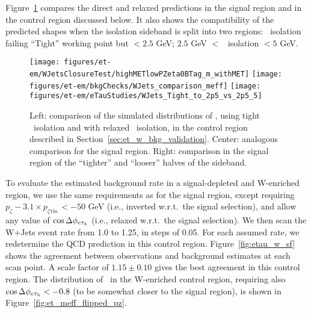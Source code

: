 Figure~\ref{fig:et-w-shape} compares the direct and relaxed
predictions in the signal region and in the control region discussed
below.  It also shows the compatibility of the predicted shapes when
the isolation sideband is split into two regions: \tauh ~isolation
failing ``Tight'' working point but $<2.5$ GeV; $2.5$ GeV $<$ \tauh ~isolation $< 5$ GeV.

\begin{figure}[thbp!]\centering
  \texttt{[image: figures/et-em/WJetsClosureTest/highMETlowPZeta0BTag\_m\_withMET]}
  \texttt{[image: figures/et-em/bkgChecks/WJets\_comparison\_meff]}
  \texttt{[image: figures/et-em/eTauStudies/WJets\_Tight\_to\_2p5\_vs\_2p5\_5]}
  \caption{\label{fig:et-w-shape} Left: comparison of the simulated
    distributions of \meffetau , using tight \tauh ~isolation and with
    relaxed \tauh ~isolation, in the control region described in
    Section~\ref{sec:et_w_bkg_validation}.  Center: analogous
    comparison for the signal region.  Right: comparison in the signal
    region of the ``tighter'' and ``looser'' halves of the sideband.}
\end{figure}

To evaluate the estimated background rate in a signal-depleted and
W-enriched region, we use the same requirements as for the signal
region, except requiring $p_{\zeta} - 3.1 \times p_{\zeta\mathrm{vis.}}<
-50$ GeV (i.e., inverted w.r.t.~the signal selection), and allow
any value of $\cos{\Delta\phi_{e\ensuremath{\tau_h}}}$ (i.e., relaxed w.r.t.~the
signal selection).  We then scan the W+Jets event rate from 1.0 to
1.25, in steps of 0.05.  For each assumed rate, we redetermine the QCD
prediction in this control region.  Figure~\ref{fig:etau_w_sf} shows
the agreement between observations and background estimates at each
scan point.  A scale factor of $1.15\pm0.10$ gives the best agreement
in this control region.  The distribution of \meffetau ~in the
W-enriched control region, requiring also
$\cos{\Delta\phi_{e\ensuremath{\tau_h}}}<-0.8$ (to be somewhat closer to the signal
region), is shown in Figure~\ref{fig:et_meff_flipped_pz}.

